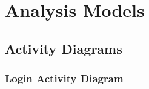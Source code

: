 \section{Analysis Models}
	
	\subsection{Activity Diagrams}
		\subsubsection{Login Activity Diagram}
		\centerline{}
		
